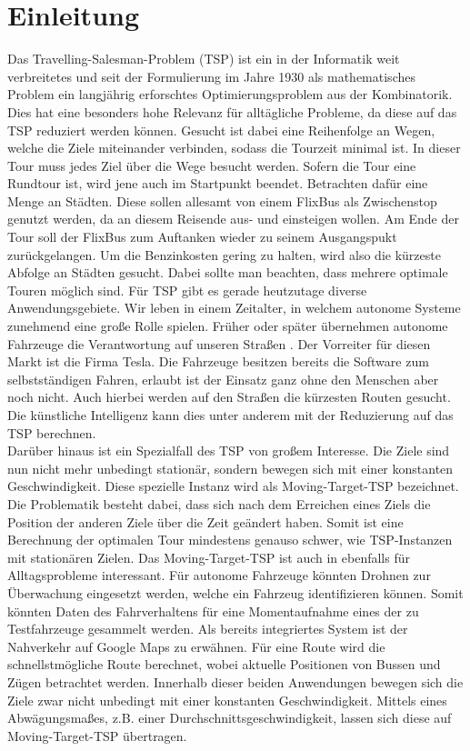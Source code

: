 \documentclass[german,version-2019-11]{uzl-thesis}
\begin{document}
\chapter{Einleitung}

Das Travelling-Salesman-Problem (TSP) ist ein in der Informatik weit verbreitetes und seit der Formulierung im Jahre 1930 als mathematisches Problem ein langjährig erforschtes Optimierungsproblem aus der Kombinatorik. Dies hat eine besonders hohe Relevanz für alltägliche Probleme, da diese auf das TSP reduziert werden können. Gesucht ist dabei eine Reihenfolge an Wegen, welche die Ziele miteinander verbinden, sodass 
die Tourzeit minimal ist. In dieser Tour muss jedes Ziel über die Wege besucht werden. Sofern die Tour eine Rundtour ist, wird jene auch im Startpunkt beendet. Betrachten dafür eine Menge an Städten. Diese sollen allesamt von einem FlixBus als Zwischenstop genutzt werden, da an diesem Reisende aus- und einsteigen wollen. Am Ende der Tour soll der FlixBus zum Auftanken wieder zu seinem Ausgangspukt zurückgelangen. Um die Benzinkosten gering zu halten, wird also die kürzeste Abfolge an Städten gesucht. Dabei sollte man beachten, dass mehrere optimale Touren möglich sind. Für TSP gibt es gerade heutzutage diverse Anwendungsgebiete. Wir leben in einem Zeitalter, in welchem autonome Systeme zunehmend eine große Rolle spielen. Früher oder später übernehmen autonome Fahrzeuge die Verantwortung auf unseren Straßen \cite{minx2015autonomes}. Der Vorreiter für diesen Markt ist die Firma Tesla. Die Fahrzeuge besitzen bereits die Software zum selbstständigen Fahren, erlaubt ist der Einsatz ganz ohne den Menschen aber noch nicht. Auch hierbei werden auf den Straßen die kürzesten Routen gesucht. Die künstliche Intelligenz kann dies unter anderem mit der Reduzierung auf das TSP berechnen. \\
Darüber hinaus ist ein Spezialfall des TSP von großem Interesse. Die Ziele sind nun nicht mehr unbedingt stationär, sondern bewegen sich mit einer konstanten Geschwindigkeit. Diese spezielle Instanz wird als Moving-Target-TSP bezeichnet. Die Problematik besteht dabei, dass sich nach dem Erreichen eines Ziels die Position der anderen Ziele über die Zeit geändert haben. Somit ist eine Berechnung der optimalen Tour mindestens genauso schwer, wie TSP-Instanzen mit stationären Zielen. Das Moving-Target-TSP ist auch in ebenfalls für Alltagsprobleme interessant. Für autonome Fahrzeuge könnten Drohnen zur Überwachung eingesetzt werden, welche ein Fahrzeug identifizieren können. Somit könnten Daten des Fahrverhaltens für eine Momentaufnahme eines der zu Testfahrzeuge gesammelt werden. Als bereits integriertes System ist der Nahverkehr auf Google Maps zu erwähnen. Für eine Route wird die schnellstmögliche Route berechnet, wobei aktuelle Positionen von Bussen und Zügen betrachtet werden. Innerhalb dieser beiden Anwendungen bewegen sich die Ziele zwar nicht unbedingt mit einer konstanten Geschwindigkeit. Mittels eines Abwägungsmaßes, z.B. einer Durchschnittsgeschwindigkeit, lassen sich diese auf Moving-Target-TSP übertragen. \\
\end{document}

